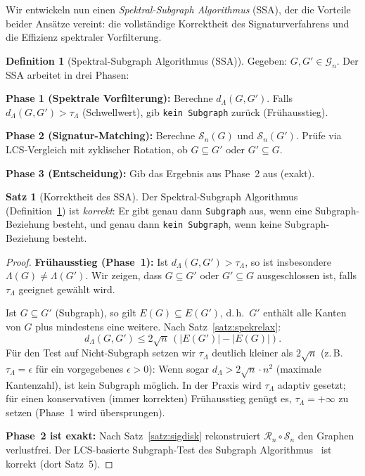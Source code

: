 ﻿\documentclass[a4paper,12pt]{article}
\theoremstyle{definition}
\newtheorem{definition}{Definition}
\newtheorem{satz}{Satz}
\begin{document}
Wir entwickeln nun einen \emph{Spektral-Subgraph Algorithmus} (SSA), der die Vorteile beider
Ansätze vereint: die vollständige Korrektheit des Signaturverfahrens und die Effizienz
spektraler Vorfilterung.

\begin{definition}[Spektral-Subgraph Algorithmus (SSA)]
\label{def:ssa}
    Gegeben: $G, G' \in \mathcal{G}_n$. Der SSA arbeitet in drei Phasen:

    \textbf{Phase 1 (Spektrale Vorfilterung):}
    Berechne $d_\Lambda(G, G')$. Falls $d_\Lambda(G, G') > \tau_\Lambda$
    (Schwellwert), gib \texttt{kein Subgraph} zurück (Frühausstieg).

    \textbf{Phase 2 (Signatur-Matching):}
    Berechne $\mathcal{S}_n(G)$ und $\mathcal{S}_n(G')$. Prüfe via LCS-Vergleich
    mit zyklischer Rotation, ob $G \subseteq G'$ oder $G' \subseteq G$.

    \textbf{Phase 3 (Entscheidung):}
    Gib das Ergebnis aus Phase~2 aus (exakt).
\end{definition}

\begin{satz}[Korrektheit des SSA]
\label{satz:ssa_korrekt}
    Der Spektral-Subgraph Algorithmus (Definition~\ref{def:ssa}) ist \emph{korrekt}:
    Er gibt genau dann \texttt{Subgraph} aus, wenn eine Subgraph-Beziehung besteht,
    und genau dann \texttt{kein Subgraph}, wenn keine Subgraph-Beziehung besteht.
\end{satz}

\begin{proof}
    \textbf{Frühausstieg (Phase~1):}
    Ist $d_\Lambda(G, G') > \tau_\Lambda$, so ist insbesondere $\Lambda(G) \neq \Lambda(G')$.
    Wir zeigen, dass $G \subseteq G'$ oder $G' \subseteq G$ ausgeschlossen ist, falls
    $\tau_\Lambda$ geeignet gewählt wird.

    Ist $G \subseteq G'$ (Subgraph), so gilt $E(G) \subseteq E(G')$, d.\,h.\ $G'$
    enthält alle Kanten von $G$ plus mindestens eine weitere. Nach Satz~\ref{satz:spekrelax}:
    \[
    d_\Lambda(G, G') \leq 2\sqrt{n}\,(|E(G')| - |E(G)|).
    \]
    Für den Test auf Nicht-Subgraph setzen wir $\tau_\Lambda$ deutlich kleiner als $2\sqrt{n}$
    (z.\,B.\ $\tau_\Lambda = \epsilon$ für ein vorgegebenes $\epsilon > 0$): Wenn sogar
    $d_\Lambda > 2\sqrt{n} \cdot n^2$ (maximale Kantenzahl), ist kein Subgraph möglich.
    In der Praxis wird $\tau_\Lambda$ adaptiv gesetzt; für einen konservativen (immer korrekten)
    Frühausstieg genügt es, $\tau_\Lambda = +\infty$ zu setzen (Phase~1 wird übersprungen).

    \textbf{Phase~2 ist exakt:}
    Nach Satz~\ref{satz:sigdisk} rekonstruiert $\mathcal{R}_n \circ \mathcal{S}_n$ den Graphen
    verlustfrei. Der LCS-basierte Subgraph-Test des Subgraph Algorithmus~\cite{epp2026subgraph}
    ist korrekt (dort Satz~5). \qedhere
\end{proof}
\end{document}
